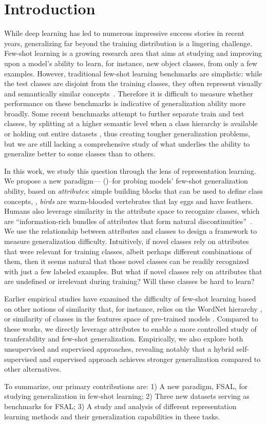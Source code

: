 \section{Introduction}

While deep learning has led to numerous impressive success stories in recent
years, generalizing far beyond the training distribution is a lingering
challenge. Few-shot learning is a growing research area that aims at studying
and improving upon a model's ability to learn, for instance, new object
classes, from only a few examples. However, traditional few-shot learning
benchmarks are simplistic: while the test classes are disjoint from the
training classes, they often represent visually and semantically similar
concepts~\citep{lake2011oneshot,matchingnet}. Therefore it is difficult to
measure whether performance on these benchmarks is indicative of generalization
ability more broadly. Some recent benchmarks attempt to further separate train
and test classes, by splitting at a higher semantic level when a class
hierarchy is available \citep{fewshotssl} or holding out entire datasets
\cite{closerlook,broadstudy,triantafillou2019meta}, thus creating tougher
generalization problems, but we are still lacking a comprehensive study of what
underlies the ability to generalize better to some classes than to others.

In this work, we study this question through the lens of representation
learning. We propose a new paradigm---\titlelower{} (\taskname{})--for probing
models' few-shot generalization ability, based on \emph{attributes}: simple
building blocks that can be used to define class concepts, \eg, \emph{birds}
are warm-blooded vertebrates that lay eggs and have feathers. Humans also
leverage similarity in the attribute space to recognize classes, which are
``information-rich bundles of attributes that form natural
discontinuities''~\citep{roschmervis1975family}. We use the relationship
between attributes and classes to design a framework to measure generalization
difficulty. Intuitively, if novel classes rely on attributes that were relevant
for training classes, albeit perhaps different combinations of them, then it
seems natural that those novel classes can be readily recognized with just a
few labeled examples. But what if novel classes rely on attributes that are
undefined or irrelevant during training? Will these classes be hard to learn?

Earlier empirical studies have examined the difficulty of few-shot learning
based on other notions of similarity that, for instance, relies on the WordNet
hierarchy \cite{sariyildiz2021}, or similarity of classes in the features space
of pre-trained models \cite{arnold2021embedding}. Compared to these works, we
directly leverage attributes to enable a more controlled study of
tranferability and few-shot generalization. Empirically, we also explore both
unsupervised and supervised approaches, revealing notably that a hybrid
self-supervised and supervised approach achieves stronger generalization
compared to other alternatives.

To summarize, our primary contributions are: 1) A new paradigm, FSAL, for
studying generalization in few-shot learning; 2) Three new datasets serving as
benchmarks for FSAL; 3) A study and analysis of different representation
learning methods and their generalization capabilities in these tasks.